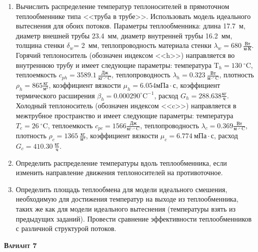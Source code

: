 \begin{enumerate} 
\item Вычислить распределение температур теплоносителей в прямоточном теплообменнике типа <<труба в трубе>>. Использовать модель идеального вытеснения для обоих потоков. Параметры теплообменника: длина  17.7~м, диаметр внешней трубы 23.4~мм,  диаметр внутренней трубы 16.2~мм, толщина стенки $\delta_{w}$=     2~мм,  теплопроводность материала стенки $\lambda_{w}=  680~\frac{\text{Вт}}{\text{м} \cdot \text{К}}$.  Горячий теплоноситель (обозначен индексом <<h>>) направляется во внутреннюю трубу и	 имеет следующие параметры: температура $\text{T}_{h}= 130~^\circ\mathrm{C}$, теплоемкость	  $c_{p{h}}= 3589.1~\frac{\text{Дж}}{\text{кг} \cdot ^\circ\mathrm{C}}$, теплопроводность 		$\lambda_{h}= 0.323~\frac{\text{Вт}}{\text{м} \cdot ^\circ\mathrm{C}}$, плотность 		$\rho_{h}=  865 \frac{\text{кг}}{\text{м}^3}$, коэффициент вязкости $\mu_{h}=6.054 \text{мПа} 		\cdot \text{с} $, коэффициент термического расширения $\beta_{h}=0.000290 ^\circ\mathrm{C}^{-1}$,		 расход $G_{h}= 288.638 \frac{\text{кг}}{\text{ч}}$. Холодный теплоноситель (обозначен индексом <<c>>) 		 направляется в межтрубное пространство и имеет следующие параметры: температура $T_{c}=   26		 ~^\circ\mathrm{C}$, теплоемкость $c_{p{c}}= 1566 \frac{\text{Дж}}{\text{кг} \cdot ^\circ\mathrm{C}}$,			 теплопроводность $\lambda_{c}=0.369 \frac{\text{Вт}}{\text{м} \cdot ^\circ\mathrm{C}}$, плотность 			 $\rho_{c}=  1365~\frac{\text{кг}}{\text{м}^3}$, коэффициент вязкости $\mu_{c}=6.774~\text{мПа} \cdot \text{с} $, 			 расход $G_{c}=410.30~\frac{\text{кг}}{\text{ч}}$. 

\item Определить распределение температуры вдоль теплообменника, если 	изменить направление движения теплоносителей на противоточное.

\item Определить площадь теплообмена для модели идеального смешения, необходимую для достижения 	температур на выходе из теплообменника, таких же как для модели идеального вытеснения (температуры взять из предыдущих заданий).	Провести сравнение эффективности теплообменников с различной структурой потоков.

\end{enumerate}

\textsc{\textbf{Вариант 7}}

